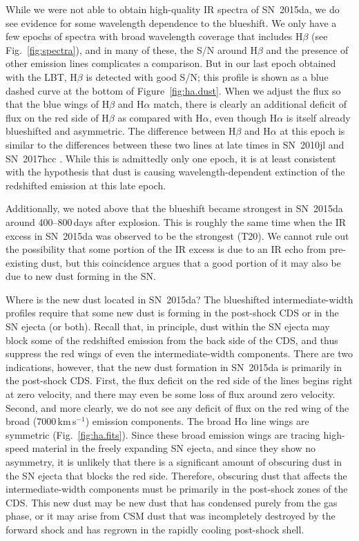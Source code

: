 \documentclass[fleqn,usenatbib,useAMS]{mnras}
\begin{document}
While we were not able to obtain high-quality IR spectra of SN~2015da, we do see
evidence for some wavelength dependence to the blueshift.  We only have
a few epochs of spectra with broad wavelength coverage that includes
H$\beta$ (see Fig.~\ref{fig:spectra}), and in many of these, the S/N around H$\beta$ and the presence of other emission lines
complicates a comparison.  But in our last epoch obtained with the LBT,
H$\beta$ is detected with good S/N; this profile is shown
as a blue dashed curve at the bottom of Figure~\ref{fig:ha.dust}.
When we adjust the flux so that the blue wings of H$\beta$ and H$\alpha$ match,
there is clearly an additional deficit of flux on the red side of
H$\beta$ as compared with H$\alpha$, even though H$\alpha$ is itself
already blueshifted and asymmetric.  The difference between H$\beta$
and H$\alpha$ at this epoch is similar to the differences between these
two lines at late times in SN~2010jl and SN~2017hcc
\citep{smith12,gall14,smith20}. While this is admittedly only one epoch,
it is at least consistent with the hypothesis that dust is causing
wavelength-dependent extinction of the redshifted emission at this late
epoch.

Additionally, we noted above that the blueshift became strongest in
SN~2015da around 400--800\,days after explosion.  This is roughly the
same time when the IR excess in SN~2015da was observed to be the
strongest (T20). We cannot rule out the possibility that some
portion of the IR excess is due to an IR echo from pre-existing dust,
but this coincidence argues that a good portion of it may also be due to new
dust forming in the SN.

Where is the new dust located in SN~2015da?  The blueshifted
intermediate-width profiles require that some new dust is forming in
the post-shock CDS or in the SN ejecta (or both).  Recall that, in
principle, dust within the SN ejecta may block some of the redshifted
emission from the back side of the CDS, and thus suppress the red wings
of even the intermediate-width components.  There are two indications,
however, that the new dust formation in SN~2015da is primarily in the
post-shock CDS.  First, the flux deficit on the red side of the lines
begins right at zero velocity, and there may even be some loss of flux
around zero velocity.  Second, and more clearly, we do not see any
deficit of flux on the red wing of the broad (7000\,km\,s$^{-1}$)
emission components.  The broad H$\alpha$ line wings are symmetric
(Fig.~\ref{fig:ha.fits}).  Since these broad emission wings are
tracing high-speed material in the freely expanding SN ejecta, and
since they show no asymmetry, it is unlikely that there is a
significant amount of obscuring dust in the SN ejecta that blocks the
red side.  Therefore, obscuring dust that affects the
intermediate-width components must be primarily in the post-shock zones
of the CDS.  This new dust may be new dust that has
condensed purely from the gas phase, or it may arise from CSM dust that
was incompletely destroyed by the forward shock and has regrown in the
rapidly cooling post-shock shell.
\end{document}

